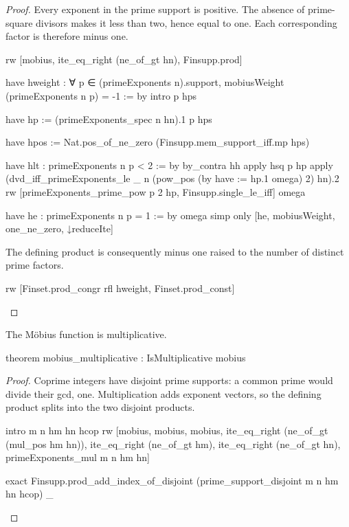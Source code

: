 \begin{proof}
  Every exponent in the prime support is positive.
  The absence of prime-square divisors makes it less than two, hence equal to one.
  Each corresponding factor is therefore minus one.

  \begin{lean}
    rw [mobius, ite_eq_right (ne_of_gt hn), Finsupp.prod]

    have hweight : ∀ p ∈ (primeExponents n).support, mobiusWeight (primeExponents n p) = -1 := by
      intro p hps

      have hp := (primeExponents_spec n hn).1 p hps

      have hpos := Nat.pos_of_ne_zero (Finsupp.mem_support_iff.mp hps)

      have hlt : primeExponents n p < 2 := by
        by_contra hh
        apply hsq p hp
        apply (dvd_iff_primeExponents_le _ n (pow_pos (by
            have := hp.1
            omega) 2) hn).2
        rw [primeExponents_prime_pow p 2 hp, Finsupp.single_le_iff]
        omega

      have he : primeExponents n p = 1 := by
        omega
      simp only [he, mobiusWeight, one_ne_zero, ↓reduceIte]
  \end{lean}

  The defining product is consequently minus one raised to the number of distinct prime factors.

  \begin{lean}
    rw [Finset.prod_congr rfl hweight, Finset.prod_const]
  \end{lean}
\end{proof}

\begin{theorem}
  \label{ent:thm:mobius-multiplicative}
  The M\"obius function is multiplicative.

  \begin{lean}
    theorem mobius_multiplicative : IsMultiplicative mobius
  \end{lean}
\end{theorem}

\begin{proof}
  Coprime integers have disjoint prime supports: a common prime would divide their gcd, one.
  Multiplication adds exponent vectors, so the defining product splits into the two disjoint
  products.

  \begin{lean}
    intro m n hm hn hcop
    rw [mobius, mobius, mobius, ite_eq_right (ne_of_gt (mul_pos hm hn)),
      ite_eq_right (ne_of_gt hm), ite_eq_right (ne_of_gt hn), primeExponents_mul m n hm hn]

    exact Finsupp.prod_add_index_of_disjoint (prime_support_disjoint m n hm hn hcop) _
  \end{lean}
\end{proof}

